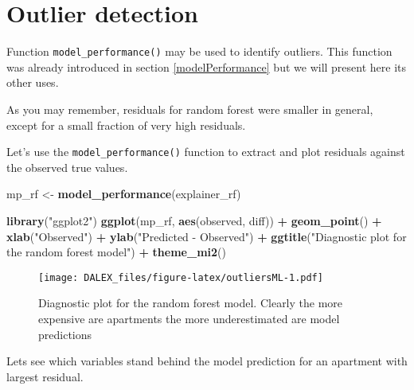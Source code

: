 \documentclass[]{book}
\newenvironment{Shaded}{\begin{snugshade}}{\end{snugshade}}
\newcommand{\KeywordTok}[1]{\textcolor[rgb]{0.13,0.29,0.53}{\textbf{#1}}}
\newcommand{\NormalTok}[1]{#1}
\newcommand{\OperatorTok}[1]{\textcolor[rgb]{0.81,0.36,0.00}{\textbf{#1}}}
\newcommand{\StringTok}[1]{\textcolor[rgb]{0.31,0.60,0.02}{#1}}
\theoremstyle{definition}
\theoremstyle{definition}
\theoremstyle{definition}
\theoremstyle{remark}
\begin{document}
\hypertarget{outlierDetection}{%
\section{Outlier detection}\label{outlierDetection}}

Function \texttt{model\_performance()} may be used to identify outliers.
This function was already introduced in section \ref{modelPerformance}
but we will present here its other uses.

As you may remember, residuals for random forest were smaller in
general, except for a small fraction of very high residuals.

Let's use the \texttt{model\_performance()} function to extract and plot
residuals against the observed true values.

\begin{Shaded}
\begin{Highlighting}[]
\NormalTok{mp_rf <-}\StringTok{ }\KeywordTok{model_performance}\NormalTok{(explainer_rf)}

\KeywordTok{library}\NormalTok{(}\StringTok{"ggplot2"}\NormalTok{)}
\KeywordTok{ggplot}\NormalTok{(mp_rf, }\KeywordTok{aes}\NormalTok{(observed, diff)) }\OperatorTok{+}\StringTok{ }\KeywordTok{geom_point}\NormalTok{() }\OperatorTok{+}\StringTok{ }
\StringTok{        }\KeywordTok{xlab}\NormalTok{(}\StringTok{"Observed"}\NormalTok{) }\OperatorTok{+}\StringTok{ }\KeywordTok{ylab}\NormalTok{(}\StringTok{"Predicted - Observed"}\NormalTok{) }\OperatorTok{+}\StringTok{ }
\StringTok{        }\KeywordTok{ggtitle}\NormalTok{(}\StringTok{"Diagnostic plot for the random forest model"}\NormalTok{) }\OperatorTok{+}\StringTok{ }\KeywordTok{theme_mi2}\NormalTok{()}
\end{Highlighting}
\end{Shaded}

\begin{figure}
\centering
\texttt{[image: DALEX\_files/figure-latex/outliersML-1.pdf]}
\caption{\label{fig:outliersML}Diagnostic plot for the random forest model.
Clearly the more expensive are apartments the more underestimated are
model predictions}
\end{figure}

Lets see which variables stand behind the model prediction for an
apartment with largest residual.

\begin{Shaded}
\end{Shaded}
\end{document}
